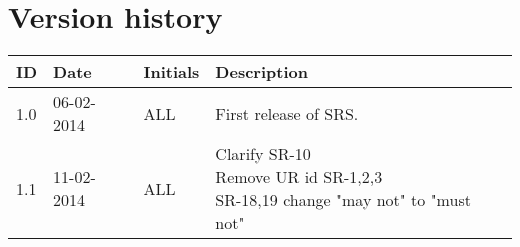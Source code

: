 \documentclass[Main]{subfiles}
\begin{document}
\section*{Version history}

\begin{tabular}{p{} p{} p{} p{}}
\hline
\textbf{ID} & \textbf{Date} & \textbf{Initials} & \textbf{Description}
\\
\hline
1.0 & 06-02-2014 & ALL & First release of SRS.
\\ 
1.1 & 11-02-2014 & ALL & \parbox[t]{0.7\textwidth}{
Clarify SR-10 \\
Remove UR id SR-1,2,3 \\
SR-18,19 change "may not" to "must not" \\
}
\\ \hline 
\end{tabular} 
\end{document}
